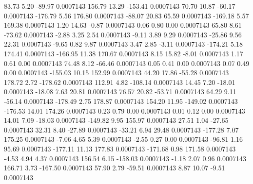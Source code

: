        83.73        5.20      -89.97     0.0007143
      156.79       13.29     -153.41     0.0007143
       70.70       10.87      -60.17     0.0007143
     -176.79        5.56      176.80     0.0007143
      -88.07       20.83       65.59     0.0007143
     -169.18        5.57      169.38     0.0007143
        1.20       14.63       -0.87     0.0007143
        0.06        0.80        0.00     0.0007143
       65.80        8.61      -73.62     0.0007143
       -2.88        3.25        2.54     0.0007143
       -9.11        3.89        9.29     0.0007143
      -25.86        9.56       22.31     0.0007143
       -9.65        0.82        9.87     0.0007143
        3.47        2.85       -3.11     0.0007143
     -174.21        5.18      174.41     0.0007143
     -166.95       11.38      170.67     0.0007143
        8.15       15.82       -8.01     0.0007143
        1.17        0.61        0.00     0.0007143
       74.48        8.12      -66.46     0.0007143
        0.05        0.41        0.00     0.0007143
        0.07        0.49        0.00     0.0007143
     -155.03       10.15      152.99     0.0007143
       44.20       17.86      -55.28     0.0007143
      178.72        2.72     -178.62     0.0007143
      112.91        4.82     -108.14     0.0007143
       14.45        7.20      -18.01     0.0007143
      -18.08        7.63       20.81     0.0007143
       76.57       20.82      -53.71     0.0007143
       64.29        9.11      -56.14     0.0007143
     -178.49        2.75      178.87     0.0007143
      154.20       11.95     -149.02     0.0007143
     -176.53       14.01      174.26     0.0007143
        0.23        0.79        0.00     0.0007143
        0.01        0.12        0.00     0.0007143
       14.01        7.09      -18.03     0.0007143
     -149.82        9.95      155.97     0.0007143
       27.51        1.04      -27.65     0.0007143
       32.31        8.40      -27.89     0.0007143
      -33.21        6.94       29.48     0.0007143
     -177.28        7.07      175.25     0.0007143
       -7.06        4.65        5.39     0.0007143
       -2.55        0.27        0.00     0.0007143
      -96.81        1.16       95.69     0.0007143
     -177.11       11.13      177.83     0.0007143
     -171.68        0.98      171.58     0.0007143
       -4.53        4.94        4.37     0.0007143
      156.54        6.15     -158.03     0.0007143
       -1.18        2.07        0.96     0.0007143
      166.71        3.73     -167.50     0.0007143
       57.90        2.79      -59.51     0.0007143
        8.87       10.07       -9.51     0.0007143
